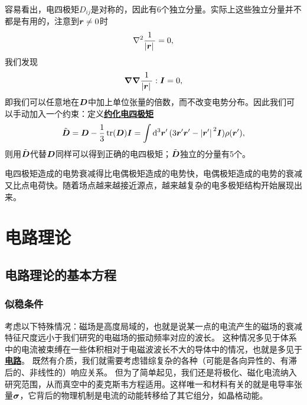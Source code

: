 \documentclass[UTF8, a4paper]{ctexart}
\newcommand*{\concept}[1]{\underline{\textbf{#1}}}
\begin{document}
容易看出，电四极矩$D_{ij}$是对称的，因此有6个独立分量。实际上这些独立分量并不都是有用的，注意到$\vb*{r} \neq 0$时
\[
    \laplacian{\frac{1}{\abs*{\vb*{r}}}} = 0,
\]
我们发现
\[
    \grad{\grad{\frac{1}{\abs*{\vb*{r}}}}} : \vb*{I} = 0,
\]
即我们可以任意地在$\vb*{D}$中加上单位张量的倍数，而不改变电势分布。因此我们可以手动加入一个约束：定义\concept{约化电四极矩}
\begin{equation}
    \tilde{\vb*{D}} = \vb*{D} - \frac{1}{3} \trace(\vb*{D}) \vb*{I} = \int \dd[3]{\vb*{r}'} (3 \vb*{r}' \vb*{r}' - \abs*{\vb*{r}'}^2 \vb*{I}) \rho(\vb*{r}') ,
\end{equation}
则用$\tilde{\vb*{D}}$代替$\vb*{D}$同样可以得到正确的电四极矩；$\tilde{\vb*{D}}$独立的分量有5个。

电四极矩造成的电势衰减得比电偶极矩造成的电势快，电偶极矩造成的电势的衰减又比点电荷快。随着场点越来越接近源点，越来越复杂的电多极矩结构开始展现出来。

\section{电路理论}

\subsection{电路理论的基本方程}

\subsubsection{似稳条件}

考虑以下特殊情况：磁场是高度局域的，也就是说某一点的电流产生的磁场的衰减特征尺度远小于我们研究的电磁场的振动频率对应的波长。
这种情况多见于体系中的电流被束缚在一些体积相对于电磁波波长不大的导体中的情况，也就是多见于\concept{电路}。
既然有介质，我们就需要考虑错综复杂的各种（可能是各向异性的、有滞后的、非线性的）响应关系。
但为了简单起见，我们还是将极化、磁化电流纳入研究范围，从而真空中的麦克斯韦方程适用。这样唯一和材料有关的就是电导率张量$\vb*{\sigma}$，它背后的物理机制是电流的动能转移给了其它组分，如晶格动能。
\end{document}

